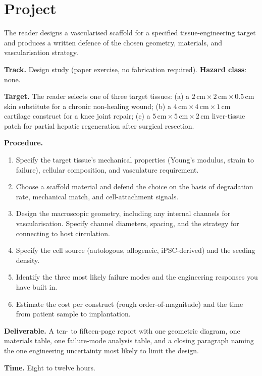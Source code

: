 \section{Project}

\begin{project}
The reader designs a vascularised scaffold for a specified
tissue-engineering target and produces a written defence of the
chosen geometry, materials, and vascularisation strategy.

\textbf{Track.} Design study (paper exercise, no fabrication required).
\textbf{Hazard class}: none.

\textbf{Target.} The reader selects one of three target tissues:
(a) a $2\,\text{cm} \times 2\,\text{cm} \times 0.5\,\text{cm}$ skin
substitute for a chronic non-healing wound; (b) a
$4\,\text{cm} \times 4\,\text{cm} \times 1\,\text{cm}$ cartilage
construct for a knee joint repair; (c) a
$5\,\text{cm} \times 5\,\text{cm} \times 2\,\text{cm}$ liver-tissue
patch for partial hepatic regeneration after surgical resection.

\textbf{Procedure.}

\begin{enumerate}[leftmargin=*]
\item Specify the target tissue's mechanical properties (Young's
  modulus, strain to failure), cellular composition, and vasculature
  requirement.
\item Choose a scaffold material and defend the choice on the basis
  of degradation rate, mechanical match, and cell-attachment
  signals.
\item Design the macroscopic geometry, including any internal
  channels for vascularisation. Specify channel diameters, spacing,
  and the strategy for connecting to host circulation.
\item Specify the cell source (autologous, allogeneic, iPSC-derived)
  and the seeding density.
\item Identify the three most likely failure modes and the engineering
  responses you have built in.
\item Estimate the cost per construct (rough order-of-magnitude) and
  the time from patient sample to implantation.
\end{enumerate}

\textbf{Deliverable.} A ten- to fifteen-page report with one geometric
diagram, one materials table, one failure-mode analysis table, and a
closing paragraph naming the one engineering uncertainty most likely
to limit the design.

\textbf{Time.} Eight to twelve hours.
\end{project}

